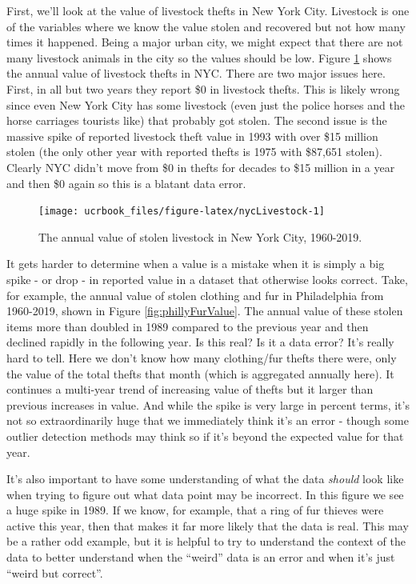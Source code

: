\documentclass[
  12pt,
  openany]{book}
\begin{document}
First, we'll look at the value of livestock thefts in New York City. Livestock is one of the variables where we know the value stolen and recovered but not how many times it happened. Being a major urban city, we might expect that there are not many livestock animals in the city so the values should be low. Figure \ref{fig:nycLivestock} shows the annual value of livestock thefts in NYC. There are two major issues here. First, in all but two years they report \$0 in livestock thefts. This is likely wrong since even New York City has some livestock (even just the police horses and the horse carriages tourists like) that probably got stolen. The second issue is the massive spike of reported livestock theft value in 1993 with over \$15 million stolen (the only other year with reported thefts is 1975 with \$87,651 stolen). Clearly NYC didn't move from \$0 in thefts for decades to \$15 million in a year and then \$0 again so this is a blatant data error.

\begin{figure}

{\centering \texttt{[image: ucrbook\_files/figure-latex/nycLivestock-1]} 

}

\caption{The annual value of stolen livestock in New York City, 1960-2019.}\label{fig:nycLivestock}
\end{figure}

It gets harder to determine when a value is a mistake when it is simply a big spike - or drop - in reported value in a dataset that otherwise looks correct. Take, for example, the annual value of stolen clothing and fur in Philadelphia from 1960-2019, shown in Figure \ref{fig:phillyFurValue}. The annual value of these stolen items more than doubled in 1989 compared to the previous year and then declined rapidly in the following year. Is this real? Is it a data error? It's really hard to tell. Here we don't know how many clothing/fur thefts there were, only the value of the total thefts that month (which is aggregated annually here). It continues a multi-year trend of increasing value of thefts but it larger than previous increases in value. And while the spike is very large in percent terms, it's not so extraordinarily huge that we immediately think it's an error - though some outlier detection methods may think so if it's beyond the expected value for that year.

It's also important to have some understanding of what the data \emph{should} look like when trying to figure out what data point may be incorrect. In this figure we see a huge spike in 1989. If we know, for example, that a ring of fur thieves were active this year, then that makes it far more likely that the data is real. This may be a rather odd example, but it is helpful to try to understand the context of the data to better understand when the ``weird'' data is an error and when it's just ``weird but correct''.
\end{document}
